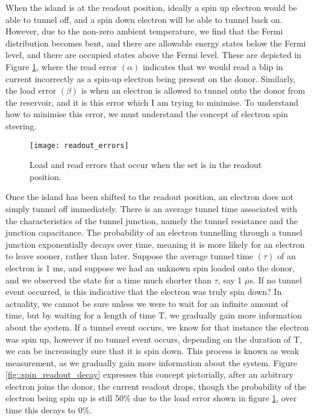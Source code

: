 When the island is at the readout position, ideally a spin up electron would be able to tunnel off, and a spin down electron will be able to tunnel back on. However, due to the non-zero ambient temperature, we find that the Fermi distribution becomes bent, and there are allowable energy states below the Fermi level, and there are occupied states above the Fermi level. These are depicted in Figure \ref{fig::errors}, where the read error $(\alpha)$ indicates that we would read a blip in current incorrectly as a spin-up electron being present on the donor. Similarly, the load error $(\beta)$ is when an electron is allowed to tunnel onto the donor from the reservoir, and it is this error which I am trying to minimise. To understand how to minimise this error, we must understand the concept of electron spin steering.

\begin{figure}[htbp!]
	\centering
	\texttt{[image: readout\_errors]}
	\caption{Load and read errors that occur when the \gls{set} is in the readout position.}
	\label{fig::errors}
\end{figure}


Once the island has been shifted to the readout position, an electron does not simply tunnel off immediately. There is an average tunnel time associated with the characteristics of the tunnel junction, namely the tunnel resistance and the junction capacitance. The probability of an electron tunnelling through a tunnel junction exponentially decays over time, meaning it is more likely for an electron to leave sooner, rather than later. 
Suppose the average tunnel time $(\tau)$ of an electron is 1 ms, and suppose we had an unknown spin loaded onto the donor, and we observed the state for a time much shorter than $\tau$, say 1 $\mu$s. If no tunnel event occurred, is this indicative that the electron was truly spin down? In actuality, we cannot be sure unless we were to wait for an infinite amount of time, but by waiting for a length of time T, we gradually gain more information about the system. If a tunnel event occurs, we know for that instance the electron was spin up, however if no tunnel event occurs, depending on the duration of T, we can be increasingly sure that it is spin down. This process is known as weak measurement, as we gradually gain more information about the system. Figure \ref{fig::spin_readout_decay} expresses this concept pictorially, after an arbitrary electron joins the donor, the current readout drops, though the probability of the electron being spin up is still 50\% due to the load error shown in figure \ref{fig::errors}, over time this decays to 0\%. 

